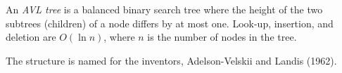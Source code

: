 \documentclass[12pt]{article}
\begin{document}
An \emph{AVL tree} is a balanced binary search tree where the height of the two
subtrees (children) of a node differs by at most one. Look-up, insertion, and
deletion are $O( \ln{n})$, where $n$ is the number of nodes in the tree.

The structure is named for the inventors, Adelson-Velskii and Landis (1962).
\end{document}
